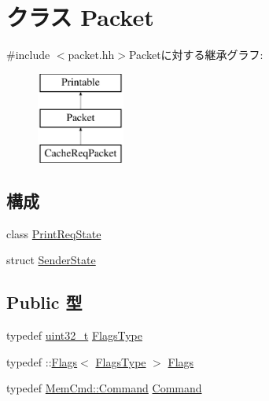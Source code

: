 \hypertarget{classPacket}{
\section{クラス Packet}
\label{classPacket}
}


{\ttfamily \#include $<$packet.hh$>$}Packetに対する継承グラフ:\begin{figure}[H]
\begin{center}
\leavevmode
\includegraphics[height=3cm]{classPacket}
\end{center}
\end{figure}
\subsection*{構成}
\begin{DoxyCompactItemize}
\item 
class \hyperlink{classPacket_1_1PrintReqState}{PrintReqState}
\item 
struct \hyperlink{structPacket_1_1SenderState}{SenderState}
\end{DoxyCompactItemize}
\subsection*{Public 型}
\begin{DoxyCompactItemize}
\item 
typedef \hyperlink{Type_8hh_a435d1572bf3f880d55459d9805097f62}{uint32\_\-t} \hyperlink{classPacket_a2da503161d95c65aea559dbabcf570aa}{FlagsType}
\item 
typedef ::\hyperlink{classFlags}{Flags}$<$ \hyperlink{classPacket_a2da503161d95c65aea559dbabcf570aa}{FlagsType} $>$ \hyperlink{classPacket_ad6cda6b0b8d7ddfbf8e769082577b482}{Flags}
\item 
typedef \hyperlink{classMemCmd_a2afce0a47a93eee73a314d53e4890153}{MemCmd::Command} \hyperlink{classPacket_a1f48acf35af3589c5f137c85deff8e85}{Command}
\end{DoxyCompactItemize}
